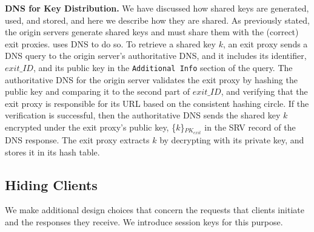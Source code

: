 \textbf{DNS for Key Distribution.}
We have discussed how shared keys are generated, used, and stored, and here we describe how they are shared.  As previously 
stated, the origin servers generate shared keys and must share them with the (correct) exit proxies.  \system{} uses DNS
to do so.  To retrieve a shared key $k$, an exit proxy sends a DNS query to the origin server's authoritative DNS, and 
it includes its identifier, $exit\_ID$, and its public key in the {\tt Additional Info} section of the query.  The 
authoritative DNS for the origin server validates the exit proxy by hashing the public key and comparing it to the 
second part of $exit\_ID$, and verifying that the exit proxy is responsible for its URL based on the consistent 
hashing circle.  If the verification is successful, then the authoritative DNS sends the shared key $k$ encrypted 
under the exit proxy's public key, \{$k$\}$_{PK_{exit}}$ in the SRV record of the DNS response.  The exit proxy 
extracts $k$ by decrypting with its private key, and stores it in its hash table.


\subsection{Hiding Clients}
\label{sec:hiding_clients}
We make additional design choices that concern the requests that clients initiate
and the responses they receive. We 
introduce session keys for this purpose.

